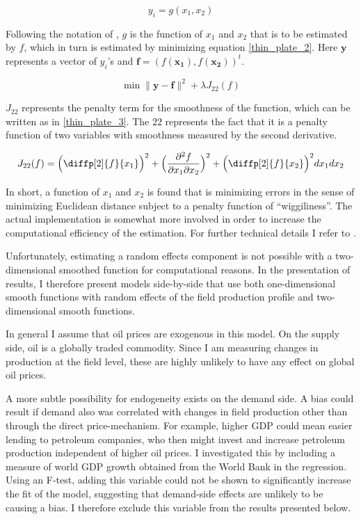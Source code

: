 \documentclass[12pt]{article}
\begin{document}
	\begin{equation}
	y_i = g(x_1, x_2)
	\label{thin_plate_1}
	\end{equation}

Following the notation of \citet{wood_generalized_2006}, $g$ is the function of $x_1$ and $x_2$ that is to be estimated by $f$, which in turn is estimated by minimizing equation \ref{thin_plate_2}.  Here $\boldsymbol{y}$ represents a vector of $y_i$'s and $\boldsymbol{f} = (f(\boldsymbol{x_1}),f(\boldsymbol{x_2}))^t$.   

	\begin{equation}
\min \|\boldsymbol{y-f}\|^2 + \lambda J_{22}(f)
\label{thin_plate_2}
	\end{equation}

$J_{22}$ represents the penalty term for the smoothness of the function, which can be written as in \ref{thin_plate_3}.  The $22$ represents the fact that it is a penalty function of two variables with smoothness measured by the second derivative.

	\begin{equation}
	J_{22}(f)= \Big(  \diffp[2]{f}{x_1} \Big)^2 +
	 \Big(\frac{\partial^2 f}{\partial x_1 \partial x_2}\Big)^2 + 
	\Big(\diffp[2]{f}{x_2} \Big)^2dx_1 dx_2
\label{thin_plate_3}
	\end{equation}

In short, a function of $x_1$ and $x_2$ is found that is minimizing errors in the sense of minimizing Euclidean distance subject to a penalty function of “wiggiliness”.  The actual implementation is somewhat more involved in order to increase the computational efficiency of the estimation.  For further technical details I refer to \citet{wood_thin_2003}. 

Unfortunately, estimating a random effects component is not possible with a two-dimensional smoothed function for computational reasons.  In the presentation of results, I therefore present models side-by-side that use both one-dimensional smooth functions with random effects of the field production profile and two-dimensional smooth functions.

In general I assume that oil prices are exogenous in this model. On the supply side, oil is a globally traded commodity.  Since I am measuring changes in production at the field level, these are highly unlikely to have any effect on global oil prices.

A more subtle possibility for endogeneity exists on the demand side. A bias could result if demand also was correlated with changes in field production other than through the direct price-mechanism. For example, higher GDP could mean easier lending to petroleum companies, who then might invest and increase petroleum production independent of higher oil prices. I investigated this by including a measure of world GDP growth obtained from the World Bank in the regression. Using an F-test, adding this variable could not be shown to significantly increase the fit of the model, suggesting that demand-side effects are unlikely to be causing a bias. I therefore exclude this variable from the results presented below.
\end{document}
